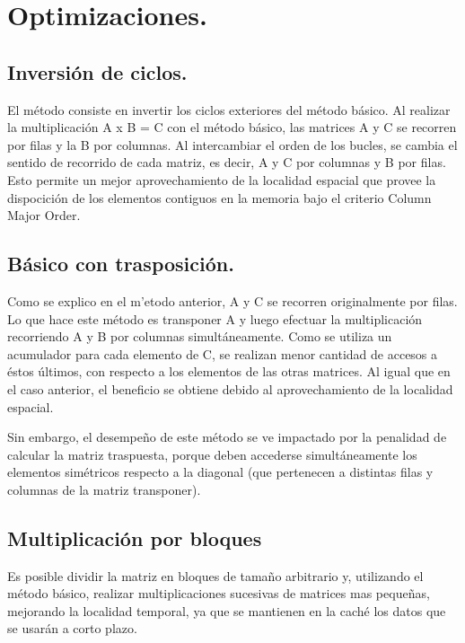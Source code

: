 \documentclass[a4paper,10pt]{article}
\begin{document}
\section{Optimizaciones.}

\subsection{Inversión de ciclos.}

El método consiste en invertir los ciclos exteriores del método básico. Al realizar la multiplicación A x B = C con el método básico, las matrices A y C se recorren por filas y la B por columnas.
Al intercambiar el orden de los bucles, se cambia el sentido de recorrido de cada matriz, es decir, A y C por columnas y B por filas. Esto permite un mejor aprovechamiento de la localidad espacial que provee la dispocición de los elementos contiguos en la memoria bajo el criterio Column Major Order.


\subsection{Básico con trasposición.}

Como se explico en el m'etodo anterior, A y C se recorren originalmente por filas. Lo que hace este método es transponer A y luego efectuar la multiplicación recorriendo A y B por columnas simultáneamente. Como se utiliza un acumulador para cada elemento de C, se realizan menor cantidad de accesos a éstos últimos, con respecto a los elementos de las otras matrices. Al igual que en el caso anterior, el beneficio se obtiene debido al aprovechamiento de la localidad espacial.

Sin embargo, el desempeño de este método se ve impactado por la penalidad de calcular la matriz traspuesta, porque deben accederse simultáneamente los elementos simétricos respecto a la diagonal (que pertenecen a distintas filas y columnas de la matriz transponer).

\subsection{Multiplicación por bloques}

Es posible dividir la matriz en bloques de tamaño arbitrario y, utilizando el método básico, realizar multiplicaciones sucesivas de matrices mas pequeñas, mejorando la localidad temporal, ya que se mantienen en la caché los datos que se usarán a corto plazo.
\end{document}
